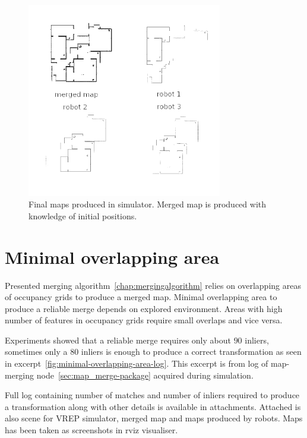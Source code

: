 \begin{figure}
    \centering
    \includegraphics[width=3.35in]{../img/merging-with-known-initial-positions-end.png}
    \caption{Final maps produced in simulator. Merged map is produced with knowledge of initial positions.}
    \label{fig:merging-with-known-initial-positions-end}
\end{figure}

\section{Minimal overlapping area}
\label{sec:minimal-overlaping-area}

Presented merging algorithm~\ref{chap:mergingalgorithm} relies on overlapping areas of occupancy grids to produce a merged map. Minimal overlapping area to produce a reliable merge depends on explored environment. Areas with high number of features in occupancy grids require small overlaps and vice versa.

Experiments showed that a reliable merge requires only about $90$ inliers, sometimes only a $80$ inliers is enough to produce a correct transformation as seen in excerpt~\ref{fig:minimal-overlapping-area-log}. This excerpt is from log of map-merging node~\ref{sec:map_merge-package} acquired during simulation.

Full log containing number of matches and number of inliers required to produce a transformation along with other details is available in attachments. Attached is also scene for \gls{VREP} simulator, merged map and maps produced by robots. Maps has been taken as screenshots in rviz visualiser.

